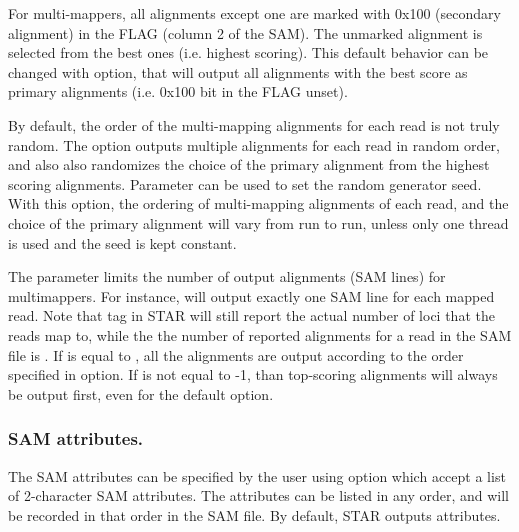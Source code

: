 \documentclass[12pt]{article}
\begin{document}
For multi-mappers, all alignments except one are marked with 0x100 (secondary alignment) in the FLAG (column 2 of the SAM). The unmarked alignment is selected from the best ones (i.e. highest scoring). This default behavior can be changed with   option, that will output all alignments with the best score as primary alignments (i.e. 0x100 bit in the FLAG unset).

By default, the order of the multi-mapping alignments for each read is not truly random.
The   option outputs multiple alignments for each read in random order, and also also randomizes the choice of the primary alignment from the highest scoring alignments. Parameter  can be used to set the random generator seed. With this option, the ordering of multi-mapping alignments of each read, and the choice of the primary alignment will vary from run to run, unless only one thread is used and the seed is kept constant.

The  parameter limits the number of output alignments (SAM lines) for multimappers. For instance,   will output exactly one SAM line for each mapped read. Note that  tag in STAR will still report the actual number of loci that the reads map to, while the the number of reported alignments for a read in the SAM file is . If  is equal to , all the alignments are output according to the order specified in  option. If  is not equal to -1, than top-scoring alignments will always be output first, even for the default   option.


\subsubsection{SAM attributes.}
The SAM attributes can be specified by the user using   option which accept a list of 2-character SAM attributes. The attributes can be listed in any order, and will be recorded in that order in the SAM file. By default, STAR outputs  attributes.
\end{document}
